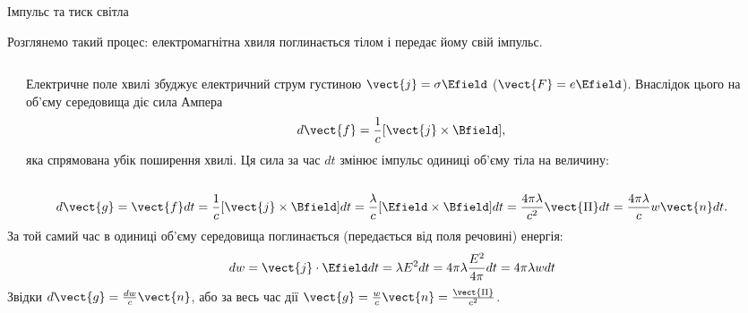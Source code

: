 \documentclass[onlytextwidth]{beamer}
\begin{document}
\begin{frame}{Імпульс та тиск світла}{}
	\begin{block}{}
		Розглянемо такий процес: електромагнітна хвиля поглинається тілом і передає йому свій імпульс.
	\end{block}
	\begin{columns}
		\begin{column}{0.4\linewidth}\centering
			
		\end{column}
		\begin{column}{0.6\linewidth}
			\begin{block}{}\justifying\small
				Електричне поле хвилі збуджує електричний струм густиною $ \vect{j} = \sigma\Efield $ ($ \vect{F} = e\Efield $). Внаслідок цього на
				об'єму середовища діє сила Ампера
				\begin{equation*}
					d\vect{f} = \frac1c[\vect{j}\times\Bfield],
				\end{equation*}
				яка спрямована убік поширення хвилі. Ця сила за час $dt$ змінює імпульс одиниці об'єму тіла на величину:

			\end{block}
		\end{column}
	\end{columns}
	\begin{block}{}\justifying
		\begin{equation*}
			d\vect{g} = \vect{f} dt =  \frac1c[\vect{j}\times\Bfield] dt = \frac{\lambda}{c}[\Efield \times\Bfield]dt = \frac{4\pi\lambda}{c^2}\vect{\Pi}dt
			=
			\frac{4\pi\lambda}{c} w \vect{n} dt.
		\end{equation*}
		За той самий час в одиниці об'єму середовища поглинається (передається від поля речовині) енергія:
		\begin{equation*}
			dw = \vect{j}\cdot\Efield dt = \lambda E^2dt = 4\pi\lambda \frac{E^2}{4\pi} dt = 4\pi\lambda w dt
		\end{equation*}
		Звідки $d\vect{g} = \frac{dw}c \vect{n}$, або за весь час дії $\vect{g} = \frac{w}{c} \vect{n} = \frac{\vect{\Pi}}{c^2}$.
	\end{block}
\end{frame}
\end{document}
